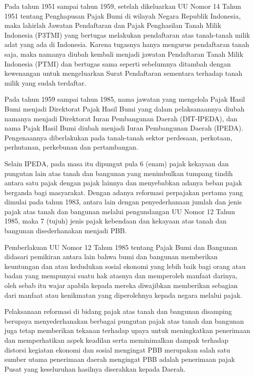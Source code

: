 \documentclass[pdftex, 12pt, oneside]{article}
\begin{document}
Pada tahun 1951 sampai tahun 1959, setelah dikeluarkan UU Nomor 14 Tahun 1951 tentang Penghapusan Pajak Bumi di wilayah Negara Republik Indonesia, maka lahirlah Jawatan Pendaftaran dan Pajak Penghasilan Tanah Milik Indonesia (P3TMI) yang bertugas melakukan pendaftaran atas tanah-tanah milik adat yang ada di Indonesia. Karena tugasnya hanya mengurus pendaftaran tanah saja, maka namanya diubah kembali menjadi jawatan Pendaftaran Tanah Milik Indonesia (PTMI) dan bertugas sama seperti sebelumnya ditambah dengan kewenangan untuk mengeluarkan Surat Pendaftaran sementara terhadap tanah milik yang sudah terdaftar.

Pada tahun 1959 sampai tahun 1985, nama jawatan yang mengelola Pajak Hasil Bumi menjadi Direktorat Pajak Hasil Bumi yang dalam pelaksanaannya diubah namanya menjadi Direktorat Iuran Pembangunan Daerah (DIT-IPEDA), dan nama Pajak Hasil Bumi diubah menjadi Iuran Pembangunan Daerah (IPEDA). Pengenaannya diberlakukan pada tanah-tanah sektor perdesaan, perkotaan, perhutanan, perkebunan dan pertambangan.

Selain IPEDA, pada masa itu dipungut pula 6 (enam) pajak kekayaan dan pungutan lain atas tanah dan bangunan yang menimbulkan tumpang tindih antara satu pajak dengan pajak lainnya dan menyebabkan adanya beban pajak berganda bagi masyarakat. Dengan adanya reformasi perpajakan pertama yang dimulai pada tahun 1983, antara lain dengan penyederhanaan jumlah dan jenis pajak atas tanah dan bangunan melalui pengundangan UU Nomor 12 Tahun 1985, maka 7 (tujuh) jenis pajak kebendaan dan kekayaan atas tanah dan bangunan disederhanakan menjadi PBB.

Pemberlakuan UU Nomor 12 Tahun 1985 tentang Pajak Bumi dan Bangunan didasari pemikiran antara lain bahwa bumi dan bangunan memberikan keuntungan dan atau kedudukan sosial ekonomi yang lebih baik bagi orang atau badan yang mempunyai suatu hak atasnya dan memperoleh manfaat darinya, oleh sebab itu wajar apabila kepada mereka diwajibkan memberikan sebagian dari manfaat atau kenikmatan yang diperolehnya kepada negara melalui pajak.

Pelaksanaan reformasi di bidang pajak atas tanah dan bangunan disamping berupaya menyederhanakan berbagai pungutan pajak atas tanah dan bangunan juga tetap memberikan tekanan terhadap upaya untuk meningkatkan penerimaan dan memperhatikan aspek keadilan serta meminimalkan dampak terhadap distorsi kegiatan ekonomi dan sosial mengingat PBB merupakan salah satu sumber utama penerimaan daerah mengingat PBB adalah penerimaan pajak Pusat yang keseluruhan hasilnya diserahkan kepada Daerah.
\end{document}
